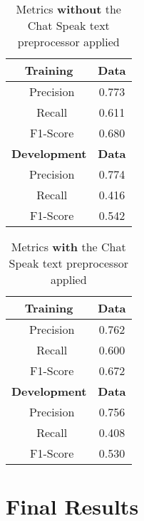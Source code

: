 \documentclass[11pt,letterpaper]{article}
\begin{document}
\begin{table}[p]
\begin{center}
\begin{tabularx}{111pt}{|c|c|}
\hline
\bf Training & \bf Data \\ 
\hline
\ Precision & 0.773 \\
\ Recall & 0.611 \\
\ F1-Score & 0.680 \\
\hline
\bf Development & \bf Data \\ 
\hline
\ Precision & 0.774 \\
\ Recall & 0.416 \\
\ F1-Score & 0.542 \\
\hline
\end{tabularx}
\end{center}
\caption{\label{chatspeak-without-table} Metrics {\bf without} the Chat Speak text preprocessor applied }
\end{table}

\begin{table}
\begin{center}
\begin{tabularx}{111pt}{|c|c|}
\hline
\bf Training & \bf Data \\ 
\hline
\ Precision & 0.762 \\
\ Recall & 0.600 \\
\ F1-Score & 0.672 \\
\hline
\bf Development & \bf Data \\ 
\hline
\ Precision & 0.756 \\
\ Recall & 0.408 \\
\ F1-Score & 0.530 \\
\hline
\end{tabularx}
\end{center}
\caption{\label{chatspeak-with-table} Metrics {\bf with} the Chat Speak text preprocessor applied }
\end{table}


\section{Final Results}
\end{document}

